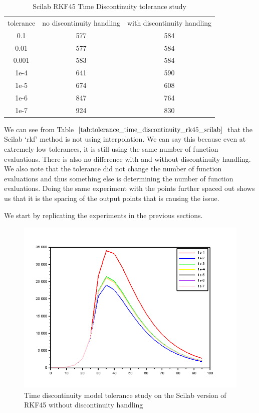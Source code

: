 \begin{table}[H]
\caption {Scilab RKF45 Time Discontinuity tolerance study} 
\label{tab:tolerance_time_discontinuity_rk45_scilab} 
\begin{center}
\begin{tabular}{ c c c }
tolerance & no discontinuity handling & with discontinuity handling\\ 
0.1 & 577 & 584 \\
0.01 & 577 & 584 \\
0.001 & 583 & 584 \\
1e-4 & 641 & 590 \\
1e-5 & 674 & 608 \\
1e-6 & 847 & 764 \\
1e-7 & 924 & 830 \\
\end{tabular}
\end{center}
\end{table}
We can see from Table $\ref{tab:tolerance_time_discontinuity_rk45_scilab}$ that the Scilab `rkf' method is not using interpolation. We can say this because even at extremely low tolerances, it is still using the same number of function evaluations. There is also no difference with and without discontinuity handling. We also note that the tolerance did not change the number of function evaluations and thus something else is determining the number of function evaluations. Doing the same experiment with the points further spaced out shows us that it is the spacing of the output points that is causing the issue.

We start by replicating the experiments in the previous sections.
\begin{figure}[H]
\centering
\includegraphics[width=0.7\linewidth]{./figures/tolerance_time_rkf_further_no_event_sci}
\caption{Time discontinuity model tolerance study on the Scilab version of RKF45 without discontinuity handling}
\label{fig:tolerance_time_rkf_further_no_event_sci}
\end{figure}

